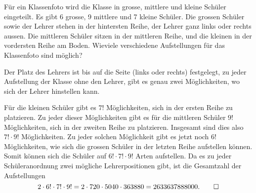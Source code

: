 Für ein Klassenfoto wird die Klasse in grosse, mittlere und kleine
Schüler eingeteilt. Es gibt 6 grosse, 9 mittlere und 7 kleine
Schüler. Die grossen Schüler sowie der Lehrer stehen in der
hintersten Reihe, der Lehrer ganz links oder rechts aussen. Die mittleren
Schüler sitzen in der mittleren Reihe, und die kleinen in der
vordersten Reihe am Boden. Wieviele verschiedene Aufstellungen für das
Klassenfoto sind möglich?

\begin{loesung}
Der Platz des Lehrers ist bis auf die Seite (links oder rechts)
festgelegt, zu jeder Aufstellung der Klasse ohne den Lehrer, gibt
es genau zwei Möglichkeiten, wo sich der Lehrer hinstellen kann.

Für die kleinen Schüler gibt es $7!$ Möglichkeiten, sich in
der ersten Reihe zu platzieren. Zu jeder dieser Möglichkeiten
gibt es für die mittleren Schüler $9!$ Möglichkeiten, sich in
der zweiten Reihe zu platzieren. Insgesamt sind dies also $7! \cdot 9!$
Möglichkeiten. Zu jeder solchen Möglichkeit gibt es jetzt noch $6!$
Möglichkeiten, wie sich die grossen Schüler in der letzten Reihe
aufstellen können. Somit können sich die Schüler auf $6!\cdot 7!\cdot 9!$
Arten aufstellen. Da es zu jeder Schüleranordnung zwei mögliche
Lehrerpositionen gibt, ist die Gesamtzahl der Aufstellungen
\[
2\cdot 6!\cdot 7!\cdot 9!=
2\cdot 720 \cdot 5040 \cdot 363880=2633637888000.
\qedhere
\]
\end{loesung}

